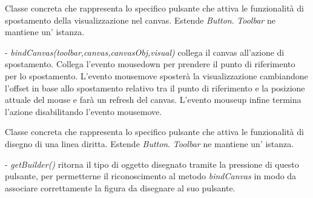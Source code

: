 Classe concreta che rappresenta lo specifico pulsante che attiva le funzionalit\` a di spostamento della visualizzazione nel canvas.
Estende \textit{Button}.
\textit{Toolbar} ne mantiene un' istanza.
\begin{elencopuntato}[\subsubsecindent]
\item[-] \textit{bindCanvas(toolbar,canvas,canvasObj,visual)} collega il canvas all'azione di spostamento. Collega l'evento mousedown per prendere il punto di riferimento per lo spostamento. L'evento mousemove sposter\`a la visualizzazione cambiandone l'offset in base allo spostamento relativo tra il punto di riferimento e la posizione attuale del mouse e far\`a un refresh del canvas. L'evento mouseup infine termina l'azione disabilitando l'evento mousemove.
\end{elencopuntato}

Classe concreta che rappresenta lo specifico pulsante che attiva le funzionalit\` a di disegno di una linea diritta.
Estende \textit{Button}.
\textit{Toolbar} ne mantiene un' istanza.
\begin{elencopuntato}[\subsubsecindent]
\item[-] \textit{getBuilder()} ritorna il tipo di oggetto disegnato tramite la pressione di questo pulsante, per permetterne il riconoscimento al metodo \textit{bindCanvas} in modo da associare correttamente la figura da disegnare al suo pulsante.
\end{elencopuntato}

